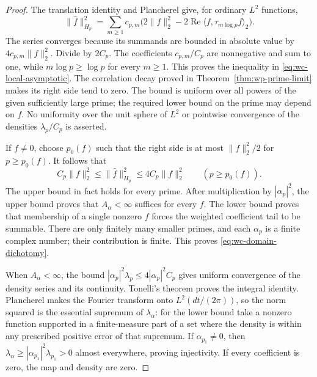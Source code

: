 \documentclass[11pt]{article}
\theoremstyle{definition}
\theoremstyle{remark}
\numberwithin{equation}{section}
\begin{document}
\begin{proof}
The translation identity and Plancherel give, for ordinary $L^2$ functions,
\[
 \|\widehat f\|_{H_p}^2
 =\sum_{m\geq1}c_{p,m}
    \bigl(2\|f\|_2^2-2\operatorname{Re}
                   \langle f,\tau_{m\log p}f\rangle_2\bigr).
\]
The series converges because its summands are bounded in absolute value
by $4c_{p,m}\|f\|_2^2$.
Divide by $2C_p$.
The coefficients $c_{p,m}/C_p$ are nonnegative and sum to one,
while $m\log p\geq\log p$ for every $m\geq1$.
This proves the inequality in \eqref{eq:wc-local-asymptotic}.
The correlation decay proved in Theorem~\ref{thm:wp-prime-limit} makes
its right side tend to zero.  The bound is uniform over all powers of
the given sufficiently large prime; the required lower bound on the
prime may depend on $f$.  No uniformity over the unit sphere of $L^2$
or pointwise convergence of the densities $\lambda_p/C_p$ is asserted.

If $f\ne0$, choose $p_0(f)$ such that the right side is at most
$\|f\|_2^2/2$ for $p\geq p_0(f)$.
It follows that
\[
 C_p\|f\|_2^2\leq\|\widehat f\|_{H_p}^2
                 \leq4C_p\|f\|_2^2\qquad(p\geq p_0(f)).
\]
The upper bound in fact holds for every prime.
After multiplication by $|\alpha_p|^2$, the upper bound proves that
$A_\alpha<\infty$ suffices for every $f$.
The lower bound proves that membership of a single nonzero $f$
forces the weighted coefficient tail to be summable.
There are only finitely many smaller primes, and each $\alpha_p$ is a
finite complex number; their contribution is finite.
This proves \eqref{eq:wc-domain-dichotomy}.

When $A_\alpha<\infty$, the bound
$|\alpha_p|^2\lambda_p\leq4|\alpha_p|^2C_p$
gives uniform convergence of the density series and its continuity.
Tonelli's theorem proves the integral identity.
Plancherel makes the Fourier transform onto $L^2(dt/(2\pi))$,
so the norm squared is the essential supremum of $\lambda_\alpha$:
for the lower bound take a nonzero function supported in a finite-measure
part of a set where the density is within any prescribed positive error
of that supremum.
If $\alpha_{p_1}\ne0$, then
$\lambda_\alpha\geq|\alpha_{p_1}|^2\lambda_{p_1}>0$
almost everywhere, proving injectivity.  If every coefficient is zero,
the map and density are zero.
\end{proof}
\end{document}
